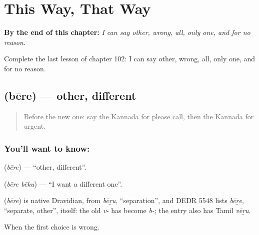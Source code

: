 
\chapter{This Way, That Way}
\label{ch:ka-this-way-that-way}

\begin{chapteropening}
\textbf{By the end of this chapter:} \emph{I can say other, wrong, all, only one, and for no reason.}

Complete the last lesson of chapter 102: I can say other, wrong, all, only one, and for no reason.
\end{chapteropening}

\section[\texorpdfstring{\kn{ಬೇರೆ} (bēre)}{ಬೇರೆ (bēre)}]{ (bēre) — other, different}

\label{lesson:KA-C102-other}



\begin{quote}
Before the new one: say the Kannada for please call, then the Kannada for urgent.
\end{quote}

\subsection*{You'll want to know: }
\textbf{} (\emph{bēre}) — \textquotedblleft{}other, different\textquotedblright{}.

\textbf{ } (\emph{bēre bēku}) — \textquotedblleft{}I want a different one\textquotedblright{}.

\begin{cousinweb}
\textbf{} (\emph{bēre}) is native Dravidian, from \emph{bēṟu}, \textquotedblleft{}separation\textquotedblright{}, and DEDR 5548 lists \emph{bēṟe}, \textquotedblleft{}separate, other\textquotedblright{}, itself: the old \emph{v-} has become \emph{b-}; the entry also has Tamil \emph{vēṟu}.
\end{cousinweb}

\begin{grammarlens}[title={What you've built}]
When the first choice is wrong.
\end{grammarlens}

